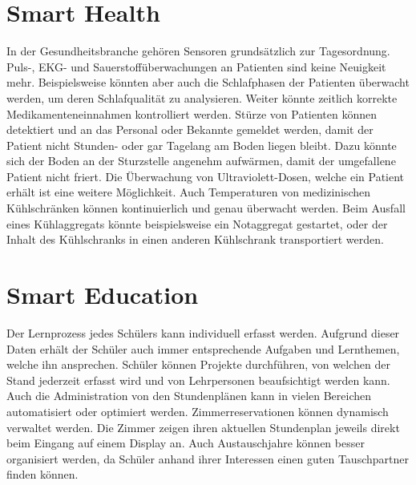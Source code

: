 \section{Smart Health}
In der Gesundheitsbranche gehören Sensoren grundsätzlich zur Tagesordnung. Puls-, EKG- und Sauerstoffüberwachungen an Patienten sind keine Neuigkeit mehr. Beispielsweise könnten aber auch die Schlafphasen der Patienten überwacht werden, um deren Schlafqualität zu analysieren. Weiter könnte zeitlich korrekte Medikamenteneinnahmen kontrolliert werden. Stürze von Patienten können detektiert und an das Personal oder Bekannte gemeldet werden, damit der Patient nicht Stunden- oder gar Tagelang am Boden liegen bleibt. Dazu könnte sich der Boden an der Sturzstelle angenehm aufwärmen, damit der umgefallene Patient nicht friert. Die Überwachung von Ultraviolett-Dosen, welche ein Patient erhält ist eine weitere Möglichkeit. Auch Temperaturen von medizinischen Kühlschränken können kontinuierlich und genau überwacht werden. Beim Ausfall eines Kühlaggregats könnte beispielsweise ein Notaggregat gestartet, oder der Inhalt des Kühlschranks in einen anderen Kühlschrank transportiert werden.

\section{Smart Education}
Der Lernprozess jedes Schülers kann individuell erfasst werden. Aufgrund dieser Daten erhält der Schüler auch immer entsprechende Aufgaben und Lernthemen, welche ihn ansprechen. Schüler können Projekte durchführen, von welchen der Stand jederzeit erfasst wird und von Lehrpersonen beaufsichtigt werden kann. Auch die Administration von den Stundenplänen kann in vielen Bereichen automatisiert oder optimiert werden. Zimmerreservationen können dynamisch verwaltet werden. Die Zimmer zeigen ihren aktuellen Stundenplan jeweils direkt beim Eingang auf einem Display an. Auch Austauschjahre können besser organisiert werden, da Schüler anhand ihrer Interessen einen guten Tauschpartner finden können.

